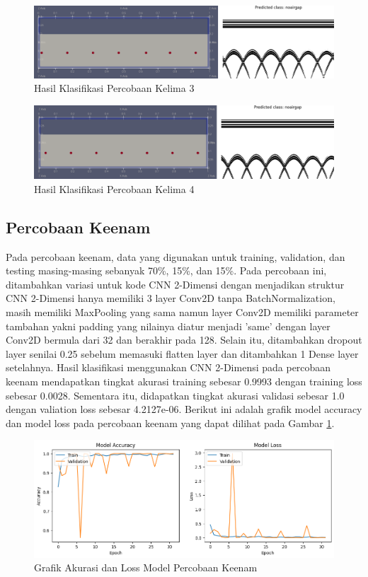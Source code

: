 \begin{figure} [H] \centering
    \includegraphics[scale=0.2]{gambar/bab4/Noarigap 19005.png}
    \caption{Hasil Klasifikasi Percobaan Kelima 3}
\end{figure}

\begin{figure} [H] \centering
    \includegraphics[scale=0.2]{gambar/bab4/Noairgap 20005.png}
    \caption{Hasil Klasifikasi Percobaan Kelima 4}
\end{figure}

\subsection{Percobaan Keenam}
Pada percobaan keenam, data yang digunakan untuk training, validation, dan testing masing-masing sebanyak 70\%, 15\%, dan 15\%. Pada percobaan ini, ditambahkan variasi untuk kode CNN 2-Dimensi dengan menjadikan struktur CNN 2-Dimensi hanya memiliki 3 layer Conv2D tanpa BatchNormalization, masih memiliki MaxPooling yang sama namun layer Conv2D memiliki parameter tambahan yakni padding yang nilainya diatur menjadi 'same' dengan layer Conv2D bermula dari 32 dan berakhir pada 128. Selain itu, ditambahkan dropout layer senilai 0.25 sebelum memasuki flatten layer dan ditambahkan 1 Dense layer setelahnya. Hasil klasifikasi menggunakan CNN 2-Dimensi pada percobaan keenam mendapatkan tingkat akurasi training sebesar 0.9993 dengan training loss sebesar 0.0028. Sementara itu, didapatkan tingkat akurasi validasi sebesar 1.0 dengan valiation loss sebesar 4.2127e-06. Berikut ini adalah grafik model accuracy dan model loss pada percobaan keenam yang dapat dilihat pada Gambar \ref{fig:trainres6}.

\begin{figure} [H] \centering
    \includegraphics[scale=0.5]{gambar/bab4/trainres6.png}
    \caption{Grafik Akurasi dan Loss Model Percobaan Keenam}
    \label{fig:trainres6}
\end{figure}


